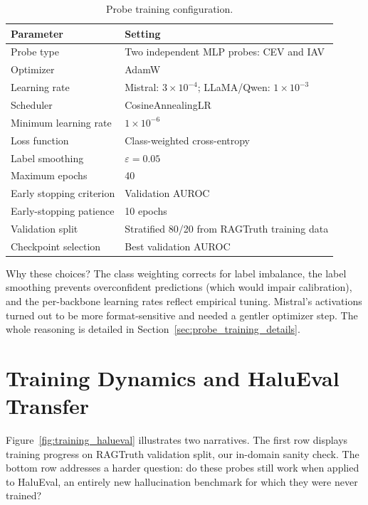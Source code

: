 \begin{table}[!htb]
\centering
\caption{Probe training configuration.}
\label{tab:training_config}
\begin{tabular}{@{}ll@{}}
\toprule
\textbf{Parameter} & \textbf{Setting} \\
\midrule
Probe type              & Two independent MLP probes: CEV and IAV \\
Optimizer               & AdamW \\
Learning rate           & Mistral: $3 \times 10^{-4}$;\; LLaMA/Qwen: $1 \times 10^{-3}$ \\
Scheduler               & CosineAnnealingLR \\
Minimum learning rate   & $1 \times 10^{-6}$ \\
Loss function           & Class-weighted cross-entropy \\
Label smoothing         & $\varepsilon = 0.05$ \\
Maximum epochs          & 40 \\
Early stopping criterion & Validation AUROC \\
Early-stopping patience & 10 epochs \\
Validation split        & Stratified 80/20 from RAGTruth training data \\
Checkpoint selection    & Best validation AUROC \\
\bottomrule
\end{tabular}
\end{table}

Why these choices? The class weighting corrects for label imbalance, the label smoothing prevents overconfident predictions (which would impair calibration), and the per-backbone learning rates reflect empirical tuning. Mistral’s activations turned out to be more format-sensitive and needed a gentler optimizer step. The whole reasoning is detailed in Section~\ref{sec:probe_training_details}.

\section{Training Dynamics and HaluEval Transfer}
\label{sec:training_dynamics}

Figure~\ref{fig:training_halueval} illustrates two narratives. The first row displays training progress on RAGTruth validation split, our in-domain sanity check. The bottom row addresses a harder question: do these probes still work when applied to HaluEval, an entirely new hallucination benchmark for which they were never trained?

